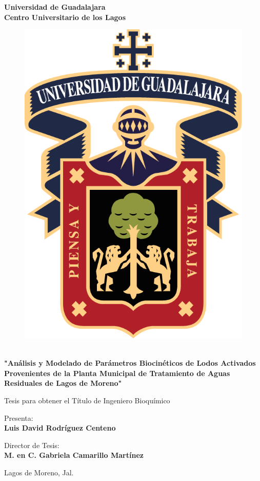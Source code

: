 \begin{titlepage}
\begin{center}
	{\fontsize{16}{1.5}\selectfont \textbf{Universidad de Guadalajara}}
	\\
	{\fontsize{14}{1.5}\selectfont \textbf{Centro Universitario de los Lagos}}
	\vspace{1cm}
	\begin{figure}[h]
	\centering
	\includegraphics[scale=0.35]{../Images/logo_udeg.png}
	\end{figure}
	\\
	\vspace{1cm}
	{\fontsize{14}{1.5}\selectfont \textbf{"Análisis y Modelado de Parámetros Biocinéticos de Lodos Activados Provenientes de la Planta Municipal de Tratamiento de Aguas Residuales de Lagos de Moreno"}}
	
	{\fontsize{14}{1.5}\selectfont Tesis para obtener el Título de Ingeniero Bioquímico}
	
	{\fontsize{14}{1.5}\selectfont Presenta: \\ \textbf{Luis David Rodríguez Centeno}}
	
	{\fontsize{14}{1.5}\selectfont Director de Tesis: \\ \textbf{M. en C. Gabriela Camarillo Martínez}}
	
	\vfill
	Lagos de Moreno, Jal. 
\end{center}
\end{titlepage}